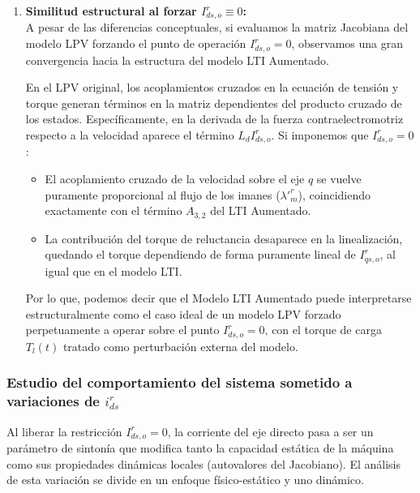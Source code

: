 \documentclass[12pt, a4paper,journal, onecolumn, compsoc]{IEEEtran}
\begin{document}
\begin{enumerate}
    \item \textbf{Similitud estructural al forzar $I^r_{ds,o} \equiv 0$:} \\
    A pesar de las diferencias conceptuales, si evaluamos la matriz Jacobiana del modelo LPV forzando el punto de operación $I^r_{ds,o} = 0$, observamos una gran convergencia hacia la estructura del modelo LTI Aumentado. 
    
    En el LPV original, los acoplamientos cruzados en la ecuación de tensión y torque generan términos en la matriz dependientes del producto cruzado de los estados. Específicamente, en la derivada de la fuerza contraelectromotriz respecto a la velocidad aparece el término $L_d I^r_{ds,o}$. Si imponemos que $I^r_{ds,o} = 0$:
    \begin{itemize}
        \item El acoplamiento cruzado de la velocidad sobre el eje $q$ se vuelve puramente proporcional al flujo de los imanes ($\lambda'^r_m$), coincidiendo exactamente con el término $A_{3,2}$ del LTI Aumentado.
        \item La contribución del torque de reluctancia desaparece en la linealización, quedando el torque dependiendo de forma puramente lineal de $I^r_{qs,o}$, al igual que en el modelo LTI.
    \end{itemize}
    
    Por lo que, podemos decir que el Modelo LTI Aumentado puede interpretarse estructuralmente como el caso ideal de un modelo LPV forzado perpetuamente a operar sobre el punto $I^r_{ds,o} = 0$, con el torque de carga $T_l(t)$ tratado como perturbación externa del modelo.
\end{enumerate}
\subsubsection{Estudio del comportamiento del sistema sometido a variaciones de $i_{ds}^r$}
Al liberar la restricción $I^r_{ds,o} = 0$, la corriente del eje directo pasa a ser un parámetro de sintonía que modifica tanto la capacidad estática de la máquina como sus propiedades dinámicas locales (autovalores del Jacobiano). El análisis de esta variación se divide en un enfoque físico-estático y uno dinámico.
\end{document}
